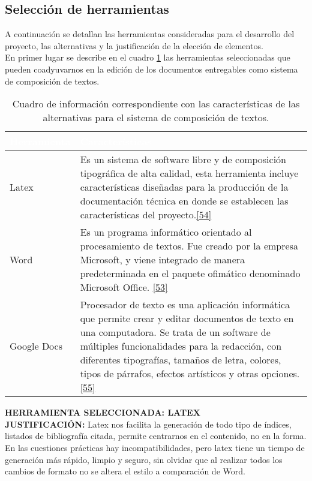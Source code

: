 \subsection{Selección de herramientas}

A continuación se detallan las herramientas consideradas para el desarrollo del proyecto, las alternativas y la justificación de la elección de elementos.\\

En primer lugar se describe en el cuadro \ref{tbl:compotex} las herramientas seleccionadas que pueden coadyuvarnos en la edición de los documentos entregables como sistema de composición de textos.

\begin{table}[H]
	\centering
	\begin{tabular}{|p{3cm}|p{10cm}|}
		\hline
		 \rowcolor{black} \textcolor{white}{\textbf{Herramienta}} & \textcolor{white}{\textbf{Características}}  \\ \hline
		Latex & Es un sistema de software libre y de composición tipográfica de alta calidad, esta herramienta incluye características diseñadas para la producción de la documentación técnica en donde se establecen las características del proyecto.\hyperlink{b54}{[54]}\\
		\hline
		Word & Es un programa informático orientado al procesamiento de textos. Fue creado por la empresa Microsoft, y viene integrado de manera predeterminada en el paquete ofimático denominado Microsoft Office. \hyperlink{b53}{[53]}\\
		\hline
		Google Docs & Procesador de texto es una aplicación informática que permite crear y editar documentos de texto en una computadora. Se trata de un software de múltiples funcionalidades para la redacción, con diferentes tipografías, tamaños de letra, colores, tipos de párrafos, efectos artísticos y otras opciones. \hyperlink{b55}{[55]}\\
		\hline
	\end{tabular}
\caption{Cuadro de información correspondiente con las características de las alternativas para el sistema de composición de textos.}
\label{tbl:compotex}
\end{table}

\textbf {HERRAMIENTA SELECCIONADA: LATEX}\\

\textbf {JUSTIFICACIÓN:} Latex nos facilita la generación de todo tipo de índices, listados de bibliografía citada, permite centrarnos en el contenido, no en la forma. En las cuestiones prácticas hay incompatibilidades, pero latex tiene un tiempo de generación más rápido, limpio y seguro, sin olvidar que al realizar todos los cambios de formato no se altera el estilo a comparación de Word.

